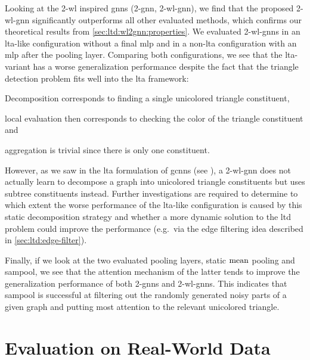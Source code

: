 Looking at the 2-\acs{wl} inspired \acp{gnn} (2-\acs{gnn}, 2-\acs{wl}-\acs{gnn}), we find that the proposed 2-\acs{wl}-\acs{gnn} significantly outperforms all other evaluated methods, which confirms our theoretical results from \cref{sec:ltd:wl2gnn:properties}.
We evaluated 2-\acs{wl}-\acsp{gnn} in an \acs{lta}-like configuration without a final \ac{mlp} and in a non-\acs{lta} configuration with an \ac{mlp} after the pooling layer.
Comparing both configurations, we see that the \acs{lta}-variant has a worse generalization performance despite the fact that the triangle detection problem fits well into the \ac{lta} framework:
\begin{enumerate*}[label={\circled{\small\arabic*}}]
	\item Decomposition corresponds to finding a single unicolored triangle constituent,
	\item local evaluation then corresponds to checking the color of the triangle constituent and
	\item aggregation is trivial since there is only one constituent.
\end{enumerate*}

However, as we saw in the \ac{lta} formulation of \acp{gcnn} (see ), a 2-\acs{wl}-\acs{gnn} does not actually learn to decompose a graph into unicolored triangle constituents but uses subtree constituents instead.
Further investigations are required to determine to which extent the worse performance of the \acs{lta}-like configuration is caused by this static decomposition strategy and whether a more dynamic solution to the \acf{ltd} problem could improve the performance (e.g.\ via the edge filtering idea described in \cref{sec:ltd:edge-filter}).

Finally, if we look at the two evaluated pooling layers, static $\operatorname{mean}$ pooling and \ac{sampool}, we see that the attention mechanism of the latter tends to improve the generalization performance of both 2-\acsp{gnn} and 2-\acs{wl}-\acsp{gnn}.
This indicates that \ac{sampool} is successful at filtering out the randomly generated noisy parts of a given graph and putting most attention to the relevant unicolored triangle.

\section{Evaluation on Real-World Data}%
\label{sec:eval:real}

